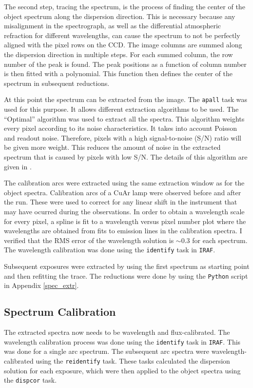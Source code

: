 The second step, tracing the spectrum, is the process of finding the center of the object spectrum along the dispersion direction. This is necessary because any misalignment in the spectrograph, as well as the differential atmospheric refraction for different wavelengths, can cause the spectrum to not be perfectly aligned with the pixel rows on the CCD. The image columns are summed along the dispersion direction in multiple steps. For each summed column, the row number of the peak is found. The peak positions as a function of column number is then fitted with a polynomial. This function  then defines the center of the spectrum in subsequent reductions.

At this point the spectrum can be extracted from the image. The \texttt{apall} task was used for this purpose. It allows different extraction algorithms to be used. The ``Optimal'' algorithm was used to extract all the spectra. This algorithm weights every pixel according to its noise characteristics. It takes into account Poisson and readout noise. Therefore, pixels with a high signal-to-noise (S/N) ratio will be given more weight. This reduces the amount of noise in the extracted spectrum that is caused by pixels with low S/N. The details of this algorithm are given in \cite{HorneOpt}.

The calibration arcs were extracted using the same extraction window as for the object spectra. Calibration arcs of a CuAr lamp were observed before and after the run. These were used to correct for any linear shift in the instrument that may have ocurred during the observations. In order to obtain a wavelength scale for every pixel, a spline is fit to a wavelength versus pixel number plot where the wavelengths are obtained from fits to emission lines in the calibration spectra. I verified that the RMS error of the wavelength solution is $\sim 0.3$ for each spectrum. The wavelength calibration was done using the \texttt{identify} task in \texttt{IRAF}.

Subsequent exposures were extracted by using the first spectrum as starting point and then refitting the trace. The reductions were done by using the \texttt{Python} script in Appendix \ref{spec_extr}.


\subsection{Spectrum Calibration}
\label{spec_cal}

The extracted spectra now needs to be wavelength and flux-calibrated. The wavelength calibration process was done using the \texttt{identify} task in \texttt{IRAF}. This was done for a single arc spectrum. The subsequent arc spectra were wavelength-calibrated using the \texttt{reidentify} task. These tasks calculated the dispersion solution for each exposure, which were then applied to the object spectra using the \texttt{dispcor} task.

